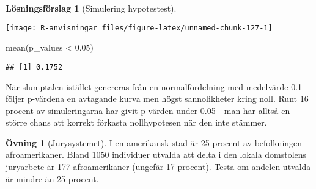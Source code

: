 \documentclass[
]{book}
\newenvironment{Shaded}{\begin{snugshade}}{\end{snugshade}}
\newcommand{\AttributeTok}[1]{\textcolor[rgb]{0.77,0.63,0.00}{#1}}
\newcommand{\ControlFlowTok}[1]{\textcolor[rgb]{0.13,0.29,0.53}{\textbf{#1}}}
\newcommand{\DecValTok}[1]{\textcolor[rgb]{0.00,0.00,0.81}{#1}}
\newcommand{\FloatTok}[1]{\textcolor[rgb]{0.00,0.00,0.81}{#1}}
\newcommand{\FunctionTok}[1]{\textcolor[rgb]{0.00,0.00,0.00}{#1}}
\newcommand{\NormalTok}[1]{#1}
\newcommand{\OtherTok}[1]{\textcolor[rgb]{0.56,0.35,0.01}{#1}}
\newcommand{\SpecialCharTok}[1]{\textcolor[rgb]{0.00,0.00,0.00}{#1}}
\theoremstyle{definition}
\theoremstyle{definition}
\theoremstyle{definition}
\newtheorem{exercise}{Övning}[chapter]
\theoremstyle{definition}
\newtheorem{hypothesis}{Lösningsförslag}[chapter]
\theoremstyle{remark}
\begin{document}
\begin{hypothesis}[Simulering hypotestest]
\begin{Shaded}
\end{Shaded}

\begin{center}\texttt{[image: R-anvisningar\_files/figure-latex/unnamed-chunk-127-1]} \end{center}

\begin{Shaded}
\begin{Highlighting}[]
\FunctionTok{mean}\NormalTok{(p\_values }\SpecialCharTok{\textless{}} \FloatTok{0.05}\NormalTok{)}
\end{Highlighting}
\end{Shaded}

\begin{verbatim}
## [1] 0.1752
\end{verbatim}

När slumptalen istället genereras från en normalfördelning med medelvärde 0.1 följer p-värdena en avtagande kurva men högst sannolikheter kring noll. Runt 16 procent av simuleringarna har givit p-värden under 0.05 - man har alltså en större chans att korrekt förkasta nollhypotesen när den inte stämmer.
\end{hypothesis}

\begin{exercise}[Jurysystemet]
I en amerikansk stad är 25 procent av befolkningen afroamerikaner. Bland 1050 individuer utvalda att delta i den lokala domstolens juryarbete är 177 afroamerikaner (ungefär 17 procent). Testa om andelen utvalda är mindre än 25 procent.
\end{exercise}
\end{document}
